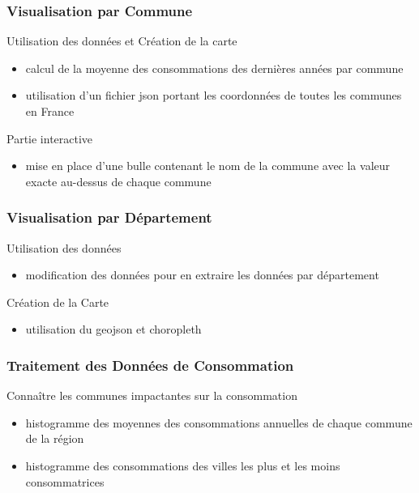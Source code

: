 \documentclass{beamer}
\begin{document}
\begin{frame}
\frametitle{Visualisation par Commune}
\begin{block}{Utilisation des données et Création de la carte}
\begin{itemize}
    \item calcul de la moyenne des consommations des dernières années par commune \\
    \item utilisation d'un fichier json portant les coordonnées de toutes les communes en France
\end{itemize}
\end{block}
\begin{block}{Partie interactive}
\begin{itemize}
    \item mise en place d'une bulle contenant le nom de la commune avec la valeur exacte au-dessus de chaque commune
\end{itemize}
\end{block}
\end{frame}


\begin{frame}
\frametitle{Visualisation par Département}
\begin{block}{Utilisation des données}
\begin{itemize}
    \item modification des données pour en extraire les données par département
\end{itemize}
\end{block}
\begin{block}{Création de la Carte}
\begin{itemize}
    \item utilisation du geojson et choropleth
\end{itemize}
\end{block}
\end{frame}


\begin{frame}
\frametitle{Traitement des Données de Consommation}
\begin{block}{Connaître les communes impactantes sur la consommation}
\begin{itemize}
    \item  histogramme des moyennes des consommations annuelles de chaque commune de la région
    \item  histogramme des consommations des villes les plus et les moins consommatrices
\end{itemize}
\end{block}
\end{frame}
\end{document}

